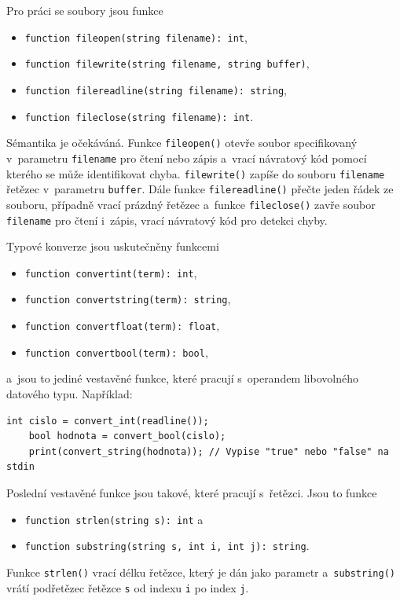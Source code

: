 Pro práci se soubory jsou funkce
\begin{itemize}
    \item \texttt{function file\textunderscore open(string filename): int},
    \item \texttt{function file\textunderscore write(string filename, string buffer)},
    \item \texttt{function file\textunderscore readline(string filename): string},
    \item \texttt{function file\textunderscore close(string filename): int}.
\end{itemize}
Sémantika je očekáváná.
Funkce \texttt{file\textunderscore open()} otevře soubor specifikovaný v~parametru \texttt{filename} pro čtení nebo zápis a~vrací návratový kód pomocí kterého se může identifikovat chyba.
\texttt{file\textunderscore write()} zapíše do souboru \texttt{filename} řetězec v~parametru \texttt{buffer}.
Dále funkce \texttt{file\textunderscore readline()} přečte jeden řádek ze souboru, případně vrací prázdný řetězec a~funkce \texttt{file\textunderscore close()} zavře soubor \texttt{filename} pro čtení i~zápis, vrací návratový kód pro detekci chyby.

Typové konverze jsou uskutečněny funkcemi
\begin{itemize}
    \item \texttt{function convert\textunderscore int(term): int},
    \item \texttt{function convert\textunderscore string(term): string},
    \item \texttt{function convert\textunderscore float(term): float},
    \item \texttt{function convert\textunderscore bool(term): bool},
\end{itemize}
a~jsou to jediné vestavěné funkce, které pracují s~operandem libovolného datového typu.
Například:
\begin{lstlisting}[language=Koubp]
    int cislo = convert_int(readline());
    bool hodnota = convert_bool(cislo);
    print(convert_string(hodnota)); // Vypise "true" nebo "false" na stdin
\end{lstlisting}

Poslední vestavěné funkce jsou takové, které pracují s~řetězci.
Jsou to funkce
\begin{itemize}
    \item \texttt{function strlen(string s): int} a 
    \item \texttt{function substring(string s, int i, int j): string}.
\end{itemize}
Funkce \texttt{strlen()} vrací délku řetězce, který je dán jako parametr a~\texttt{substring()} vrátí podřetězec řetězce \texttt{s} od indexu \texttt{i} po index \texttt{j}.

